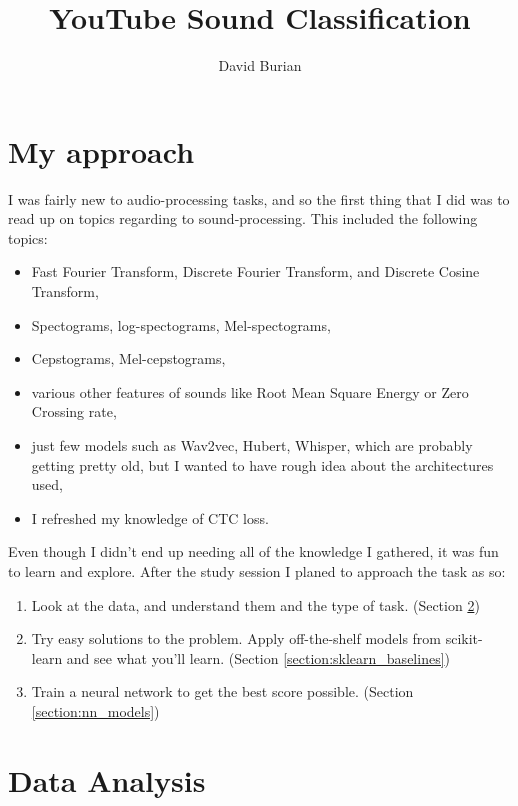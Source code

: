 \documentclass[11pt]{article}
\author{David Burian}
\title{YouTube Sound Classification}
\begin{document}
\maketitle

\section{My approach}

I was fairly new to audio-processing tasks, and so the first thing that I did
was to read up on topics regarding to sound-processing. This included the
following topics:
\begin{itemize}
  \item Fast Fourier Transform, Discrete Fourier
    Transform, and Discrete Cosine Transform,
  \item Spectograms, log-spectograms, Mel-spectograms,
  \item Cepstograms, Mel-cepstograms,
  \item various other features of sounds like Root Mean Square Energy or Zero
    Crossing rate,
  \item just few models such as Wav2vec, Hubert, Whisper, which are probably
    getting pretty old, but I wanted to
    have rough idea about the architectures used,
  \item I refreshed my knowledge of CTC loss.
\end{itemize}

Even though I didn't end up needing all of the knowledge I gathered, it was fun to
learn and explore. After the study session I planed to approach the task as so:

\begin{enumerate}

  \item Look at the data, and understand them and the type of task.
    (Section \ref{section:data_analysis})

  \item Try easy solutions to the problem. Apply off-the-shelf models from
    scikit-learn and see what you'll learn. (Section \ref{section:sklearn_baselines})

  \item Train a neural network to get the best score possible. (Section \ref{section:nn_models})

\end{enumerate}

\section{Data Analysis}\label{section:data_analysis}
\end{document}
